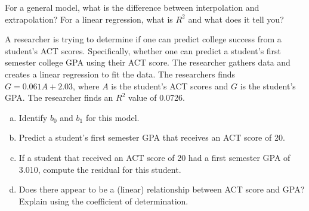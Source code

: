 \documentclass[11pt,letterpaper]{article}
\begin{document}

 For a general model, what is the difference between interpolation and extrapolation? For a linear regression, what is $R^2$ and what does it tell you?



\newpage



 A researcher is trying to determine if one can predict college success from a student's ACT scores. Specifically, whether one can predict a student's first semester college GPA using their ACT score. The researcher gathers data and creates a linear regression to fit the data. The researchers finds $G= 0.061A + 2.03$, where $A$ is the student's ACT scores and $G$ is the student's GPA. The researcher finds an $R^2$ value of 0.0726. 
	\begin{enumerate}[(a)]
	\item Identify $b_0$ and $b_1$ for this model.
	\item Predict a student's first semester GPA that receives an ACT score of 20. 
	\item If a student that received an ACT score of 20 had a first semester GPA of 3.010, compute the residual for this student. 
	\item Does there appear to be a (linear) relationship between ACT score and GPA? Explain using the coefficient of determination. 
	\end{enumerate}



\newpage
\end{document}

